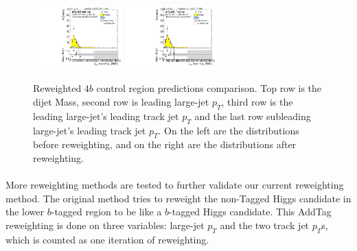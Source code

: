 \begin{figure}[htbp!]
\begin{center}
\includegraphics[width=0.31\textwidth,angle=-90]{figures/boosted/Prereweight/Moriond_FourTag_Control_sublHCand_trk0_Pt.pdf}
\includegraphics[width=0.31\textwidth,angle=-90]{figures/boosted/Control/b77_FourTag_Control_sublHCand_trk0_Pt.pdf}\\
\caption{Reweighted $4b$ control region predictions comparison. Top row is the dijet Mass, second row is leading large-\R jet $p_{T}$, third row is the leading large-\R jet's leading track jet $p_T$ and the last row subleading large-\R jet's leading track jet $p_T$. On the left are the distributions before reweighting, and on the right are the distributions after reweighting.}
\label{fig:rw-4b-comp-cr}
\end{center}
\end{figure}



\paragraph{}
More reweighting methods are tested to further validate our current reweighting method. 
The original method tries to reweight the non-Tagged Higgs candidate in the lower $b$-tagged region to be like a $b$-tagged Higgs candidate. 
This AddTag reweighting is done on three variables: large-\R jet $p_{T}$ and the two track jet $p_{T}$s, which is counted as one iteration of reweighting.


